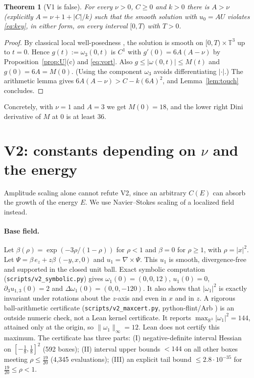 \documentclass[11pt]{article}
\newcommand{\T}{\mathbb{T}^3}
\newcommand{\R}{\mathbb{R}}
\newtheorem{theorem}{Theorem}
\theoremstyle{remark}
\newcommand{\lean}[1]{\path{#1}}
\begin{document}
\begin{theorem}[V1 is false]\label{thm:v1}
For every $\nu>0$, $C\ge0$ and $k>0$ there is $A>\nu$ (explicitly $A=\nu+1+|C|/k$) such that the smooth
solution with $u_0=AU$ violates \eqref{eq:key}, in either form, on every interval $[0,T)$ with $T>0$.
\end{theorem}
\begin{proof}
By classical local well-posedness \cite{Kato1972,RRS2016}, the solution is smooth on $[0,T)\times\T$ up to
$t=0$. Hence $g(t):=\omega_3(0,t)$ is $C^1$ with $g'(0)=6A(A-\nu)$ by Proposition~\ref{prop:U}(c) and
\eqref{eq:vort}. Also $g\le|\omega(0,t)|\le M(t)$ and $g(0)=6A=M(0)$. (Using the component $\omega_3$ avoids
differentiating $|\cdot|$.) The arithmetic lemma \lean{amplitude_exists} gives
$6A(A-\nu)>C-k(6A)^2$, and Lemma~\ref{lem:touch} concludes.
\end{proof}
Concretely, with $\nu=1$ and $A=3$ we get $M(0)=18$, and the lower right Dini derivative of $M$ at $0$ is at least $36$.

\section{V2: constants depending on $\nu$ and the energy}
Amplitude scaling alone cannot refute V2, since an arbitrary $C(E)$ can absorb the growth of the energy $E$. We use
Navier--Stokes scaling of a localized field instead.

\paragraph{Base field.} Let $\beta(\rho)=\exp(-3\rho/(1-\rho))$ for $\rho<1$ and $\beta=0$ for $\rho\ge1$, with $\rho=|x|^2$.
Let $\Psi=\beta\,e_z+z\beta\,(-y,x,0)$ and $u_1=\nabla\times\Psi$. This $u_1$ is smooth, divergence-free and supported in the closed unit ball.
Exact symbolic computation (\texttt{scripts/v2\_symbolic.py}) gives $\omega_1(0)=(0,0,12)$, $u_1(0)=0$,
$\partial_3u_{1,3}(0)=2$ and $\Delta\omega_1(0)=(0,0,-120)$. It also shows that $|\omega_1|^2$ is exactly invariant under rotations
about the $z$-axis and even in $x$ and in $z$. A rigorous ball-arithmetic certificate
(\texttt{scripts/v2\_maxcert.py}, python-flint/Arb \cite{Arb2017}) is an outside numeric check, not a Lean kernel certificate. It reports $\max_{\R^3}|\omega_1|^2=144$, attained only at the origin, so
$\|\omega_1\|_\infty=12$. Lean does not certify this maximum. The certificate has three parts: (I) negative-definite interval Hessian on $[-\tfrac18,\tfrac18]^2$ (592 boxes);
(II) interval upper bounds $<144$ on all other boxes meeting $\rho\le\tfrac{19}{20}$ (4{,}345 evaluations);
(III) an explicit tail bound $\le2.8\cdot10^{-35}$ for $\tfrac{19}{20}\le\rho<1$.
\end{document}
